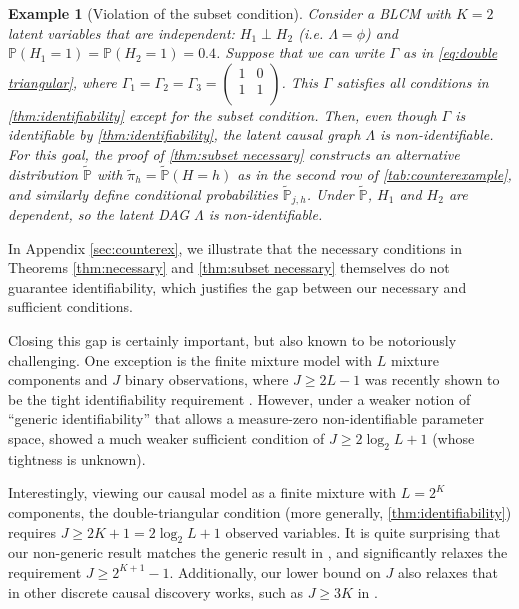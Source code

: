 \documentclass[10pt]{article} %
\newtheorem{example}{Example}
\newcommand{\PP}{\mathbb P}
\def\tilde{\widetilde}
\begin{document}
\begin{example}[Violation of the subset condition]
    Consider a BLCM with $K=2$ latent variables that are independent: $H_1 \perp H_2$ (i.e. $\Lambda = \phi$) and $\PP(H_1 = 1) = \PP(H_2 = 1) = 0.4$. Suppose that we can write $\Gamma$ as in \eqref{eq:double triangular}, where $\Gamma_1 = \Gamma_2 = \Gamma_3 = \begin{pmatrix}
        1 & 0 \\
        1 & 1 \\
    \end{pmatrix}$. This $\Gamma$ satisfies all conditions in \cref{thm:identifiability} except for the subset condition.
    Then, even though $\Gamma$ is identifiable by \cref{thm:identifiability}, the latent causal graph $\Lambda$ is non-identifiable. %
    {For this goal, the proof of \cref{thm:subset necessary} constructs an alternative distribution $\tilde{\PP}$ with $\tilde{\pi}_h = \tilde{\PP}(H=h)$ as in the second row of \cref{tab:counterexample}, and similarly define conditional probabilities $\tilde{\PP}_{j,h}$.} Under $\tilde{\PP}$, $H_1$ and $H_2$ are dependent, 
    so the latent DAG $\Lambda$ is non-identifiable.
\end{example}

In Appendix \ref{sec:counterex}, we illustrate that the necessary conditions in Theorems \ref{thm:necessary} and \ref{thm:subset necessary} themselves do not guarantee identifiability, which justifies the gap between our necessary and sufficient conditions. {Closing this gap is certainly important, but also known to be notoriously challenging. One exception is the finite mixture model with $L$ mixture components and $J$ binary observations, where $J \ge 2L-1$ was recently shown to be the tight identifiability requirement \citep{tahmasebi2018identifiability,pmlr-v291-lyu25a}. However, under a weaker notion of ``generic identifiability'' that allows a measure-zero non-identifiable parameter space, \cite{allman2009} showed a much weaker sufficient condition of $J\ge 2\log_2 L+1$ (whose tightness is unknown).

Interestingly, viewing our causal model as a finite mixture with $L = 2^K$ components, the double-triangular condition (more generally, \cref{thm:identifiability}) requires $J\ge 2K+1 = 2\log_2 L +1$ observed variables. It is quite surprising that our non-generic result matches the generic result in \cite{allman2009}, and significantly relaxes the requirement $J\ge 2^{K+1}-1$. Additionally, our lower bound on $J$ also relaxes that in other discrete causal discovery works, such as $J\ge 3K$ in \cite{chen2024learning}.}
\end{document}
